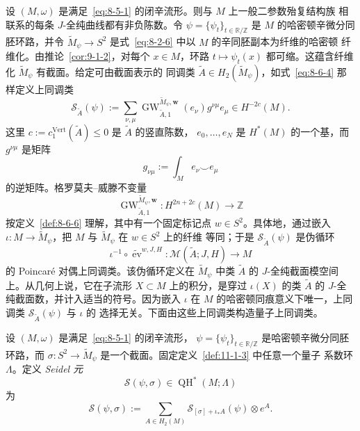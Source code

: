 设 $(M,\omega)$ 是满足~\eqref{eq:8-5-1} 的闭辛流形。则与 $M$ 上一般二参数殆复结构族
相联系的每条 $J$-全纯曲线都有非负陈数。令
$\psi=\{\psi_t\}_{t\in\mathbb R/\mathbb Z}$ 是 $M$ 的哈密顿辛微分同胚环路，并令
$\widetilde M_\psi\to S^2$ 是式~\eqref{eq:8-2-6} 中以 $M$ 的辛同胚副本为纤维的哈密顿
纤维化。由推论~\ref{cor:9-1-2}，对每个 $x\in M$，环路
$t\mapsto\psi_t(x)$ 都可缩。这蕴含纤维化 $\widetilde M_\psi$ 有截面。给定可由截面表示的
同调类 $\widetilde A\in H_2(\widetilde M_\psi)$，如式~\eqref{eq:8-6-4} 那样定义上同调类
\begin{equation}\label{eq:11-4-1}
  \mathcal S_{\widetilde A}(\psi)
  :=\sum_{\nu,\mu}
  \operatorname{GW}^{\widetilde M_\psi,\mathbf w}_{\widetilde A,1}(e_\nu)
  g^{\nu\mu}e_\mu
  \in H^{-2c}(M).
\end{equation}
这里 $c:=c_1^{\mathrm{Vert}}(\widetilde A)\le0$ 是 $\widetilde A$ 的竖直陈数，
$e_0,\ldots,e_N$
是 $H^*(M)$ 的一个基，而 $g^{\nu\mu}$ 是矩阵
\[
  g_{\nu\mu}:=\int_M e_\nu\smile e_\mu
\]
的逆矩阵。格罗莫夫--威滕不变量
\[
  \operatorname{GW}^{\widetilde M_\psi,\mathbf w}_{\widetilde A,1}:
  H^{2n+2c}(M)\longrightarrow\mathbb Z
\]
按定义~\ref{def:8-6-6} 理解，其中有一个固定标记点 $w\in S^2$。具体地，通过嵌入
$\iota:M\to\widetilde M_\psi$，把 $M$ 与 $\widetilde M_\psi$ 在 $w\in S^2$ 上的纤维
等同；于是 $\mathcal S_{\widetilde A}(\psi)$ 是伪循环
\[
  \iota^{-1}\circ\widetilde{\operatorname{ev}}^{w,J,H}:
  \mathcal M(\widetilde A;J,H)\longrightarrow M
\]
的 Poincar\'e 对偶上同调类。该伪循环定义在 $\widetilde M_\psi$ 中类 $\widetilde A$ 的
$J$-全纯截面模空间上。从几何上说，它在子流形 $X\subset M$ 上的积分，是穿过
$\iota(X)$ 的类 $\widetilde A$ 的 $J$-全纯截面数，并计入适当的符号。因为嵌入 $\iota$
在 $M$ 的哈密顿同痕意义下唯一，上同调类 $\mathcal S_{\widetilde A}(\psi)$ 与 $\iota$ 的
选择无关。下面由这些上同调类构造量子上同调类。

\begin{definition}\label{def:11-4-1}
设 $(M,\omega)$ 是满足~\eqref{eq:8-5-1} 的闭辛流形，
$\psi=\{\psi_t\}_{t\in\mathbb R/\mathbb Z}$ 是哈密顿辛微分同胚环路，而
$\sigma:S^2\to\widetilde M_\psi$ 是一个截面。固定定义~\ref{def:11-1-3} 中任意一个量子
系数环 $\Lambda$。定义 \emph{Seidel 元}
\[
  \mathcal S(\psi,\sigma)\in\operatorname{QH}^*(M;\Lambda)
\]
为
\begin{equation}\label{eq:11-4-2}
  \mathcal S(\psi,\sigma)
  :=\sum_{A\in H_2(M)}
  \mathcal S_{[\sigma]+\iota_*A}(\psi)\otimes e^A.
\end{equation}
\end{definition}

